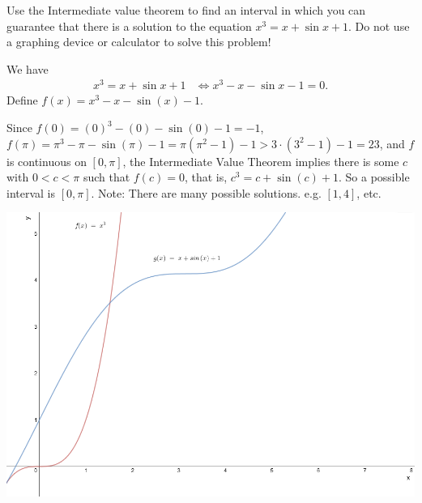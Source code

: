 \documentclass[nooutcomes]{ximera}
\begin{document}
\begin{problem}
  Use the Intermediate value theorem to find an interval in which you can guarantee that there is a solution to the equation $x^3 = x + \sin x + 1$.
  Do not use a graphing device or calculator to solve this problem!
  \begin{freeResponse}
    We have
    \begin{align*}
      x^3 = x + \sin x + 1 &\iff x^3 - x - \sin x - 1 = 0.
    \end{align*}
  Define $f(x) =  x^3 - x - \sin(x) - 1$.

    Since $f(0) = (0)^3 - (0) - \sin(0)-1 = -1$,  $f(\pi) = \pi^3 - \pi - \sin(\pi)-1 = \pi(\pi^2 - 1) - 1 > 3 \cdot (3^2 - 1) - 1 = 23$, and $f$ is continuous on $[0, \pi]$, the Intermediate Value Theorem implies there is some $c$ with $0 < c < \pi$ such that $f(c) = 0$, that is, $c^3 = c + \sin (c) + 1$.  So a possible interval is $[0,\pi]$.  Note: There are many possible solutions. e.g. $[1,4]$, etc.

	\begin{image}
	\includegraphics[scale=.5]{Figure3.png}
	\end{image}


  \end{freeResponse}
\end{problem}
	
\end{document}
